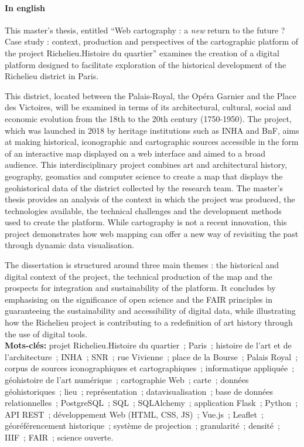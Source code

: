 \documentclass[openany, a4paper, 12pt, twoside]{book}
\begin{document}
\paragraph{In english}
\medskip
This master’s thesis, entitled \enquote{Web cartography : a \textit{new} return to the future ? Case study : context, production and perspectives of the cartographic platform of the project Richelieu.Histoire du quartier} examines the creation of a digital platform designed to facilitate exploration of the historical development of the Richelieu district in Paris.

This district, located between the Palais-Royal, the Opéra Garnier and the Place des Victoires, will be examined in terms of its architectural, cultural, social and economic evolution from the 18th to the 20th century (1750-1950). The project, which was launched in 2018 by heritage institutions such as INHA and BnF, aims at making historical, iconographic and cartographic sources accessible in the form of an interactive map displayed on a web interface and aimed to a broad audience. This interdisciplinary project combines art and architectural history, geography, geomatics and computer science to create a map that displays the geohistorical data of the district collected by the research team. The master’s thesis provides an analysis of the context in which the project was produced, the technologies available, the technical challenges and the development methods used to create the platform. While cartography is not a recent innovation, this project demonstrates how web mapping can offer a new way of revisiting the past through dynamic data visualisation. 

The dissertation is structured around three main themes : the historical and digital context of the project, the technical production of the map and the prospects for integration and sustainability of the platform. It concludes by emphasising on the significance of open science and the FAIR principles in guaranteeing the sustainability and accessibility of digital data, while illustrating how the Richelieu project is contributing to a redefinition of art history through the use of digital tools. \\

\textbf{Mots-clés:} projet Richelieu.Histoire du quartier~; Paris~; histoire de l'art et de l'architecture~; INHA~; SNR~; rue Vivienne~; place de la Bourse~; Palais Royal~; corpus de sources iconographiques et cartographiques~; informatique appliquée~; géohistoire de l'art numérique~; cartographie Web~; carte~; données géohistoriques~; lieu~; représentation~; datavisualisation~; base de données relationnelles~; PostgreSQL~; SQL~; SQLAlchemy~; application Flask~; Python~; API REST~; développement Web (HTML, CSS, JS)~; Vue.js~; Leaflet~; géoréférencement historique~; système de projection~; granularité~; densité~; IIIF~; FAIR~; science ouverte.
\end{document}
